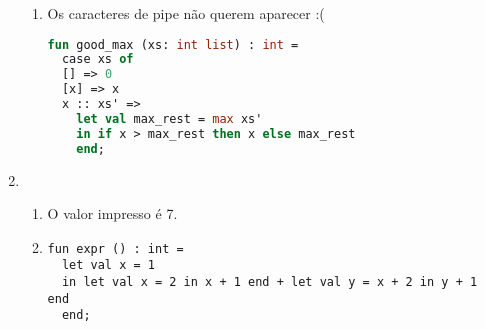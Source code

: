 \documentclass{article}
\begin{document}
\begin{enumerate}
\begin{enumerate}
      \item Os caracteres de pipe não querem aparecer :(
        \begin{lstlisting}[language=ML]  
fun good_max (xs: int list) : int =
  case xs of
  [] => 0
  [x] => x
  x :: xs' =>
    let val max_rest = max xs'
    in if x > max_rest then x else max_rest
    end;
        \end{lstlisting}
    \end{enumerate}
  \setcounter{enumi}{6}
  \item  
    \begin{enumerate}
    \item O valor impresso é 7.
    \item
\begin{lstlisting}
fun expr () : int =
  let val x = 1
  in let val x = 2 in x + 1 end + let val y = x + 2 in y + 1 end
  end; 
\end{lstlisting}
  \end{enumerate}
\end{enumerate}
\end{document}
